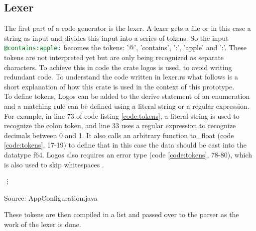 \subsection{Lexer}
The first part of a code generator is the lexer. A lexer gets a file or in this case a string as input and divides this input into a series of tokens. So the input \lstinline[language=sql]$@contains:apple:$ becomes the tokens: '@', 'contains', ':', 'apple' and ':'. These tokens are not interpreted yet but are only being recognized as separate characters. To achieve this in code the crate logos is used, to avoid writing redundant code. To understand the code written in lexer.rs what follows is a short explanation of how this crate is used in the context of this prototype.\\
To define tokens, Logos can be added to the derive statement of an enumeration and a matching rule can be defined using a literal string or a regular expression. For example, in line 73 of code listing \ref{code:tokens}, a literal string is used to recognize the colon token, and line 33 uses a regular expression to recognize decimals between 0 and 1. It also calls an arbitrary function to\_float (code \ref{code:tokens}, 17-19) to define that in this case the data should be cast into the datatype f64. Logos also requires an error type (code \ref{code:tokens}, 78-80), which is also used to skip whitespaces \parencite[cf.][n.p.]{noauthor_3_nodate}.
\begin{codeenv}
    \label{code:tokens}
    
    \vdots
    
    \centerline{Source: AppConfiguration.java}
\end{codeenv}
These tokens are then compiled in a list and passed over to the parser as the work of the lexer is done.
